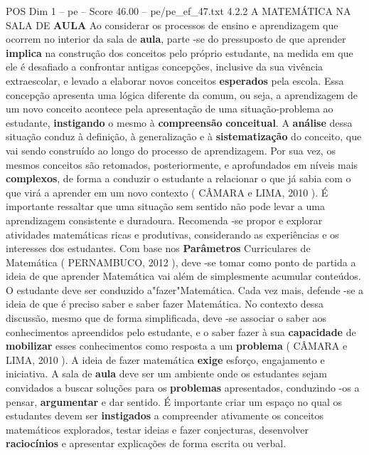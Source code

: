 \begin{textsample}{POS Dim 1 – pe – Score 46.00 – pe/pe\_ef\_47.txt}  \label{ex:f1_pos_241}
4.2.2 A MATEMÁTICA NA SALA DE \textbf{AULA} Ao considerar os processos de ensino e aprendizagem que ocorrem no interior da sala de \textbf{aula}, parte -se do pressuposto de que aprender \textbf{implica} na construção dos conceitos pelo próprio estudante, na medida em que ele é desafiado a confrontar antigas concepções, inclusive da sua vivência extraescolar, e levado a elaborar novos conceitos \textbf{esperados} pela escola.
Essa concepção apresenta uma lógica diferente da comum, ou seja, a aprendizagem de um novo conceito acontece pela apresentação de uma situação-problema ao estudante, \textbf{instigando} o mesmo à \textbf{compreensão} \textbf{conceitual}.
A \textbf{análise} dessa situação conduz à definição, à generalização e à \textbf{sistematização} do conceito, que vai sendo construído ao longo do processo de aprendizagem.
Por sua vez, os mesmos conceitos são retomados, posteriormente, e aprofundados em níveis mais \textbf{complexos}, de forma a conduzir o estudante a relacionar o que já sabia com o que virá a aprender em um novo contexto ( CÂMARA e LIMA, 2010 ).
É importante ressaltar que uma situação sem sentido não pode levar a uma aprendizagem consistente e duradoura.
Recomenda -se propor e explorar atividades matemáticas ricas e produtivas, considerando as experiências e os interesses dos estudantes.
Com base nos \textbf{Parâmetros} Curriculares de Matemática ( PERNAMBUCO, 2012 ), deve -se tomar como ponto de partida a ideia de que aprender Matemática vai além de simplesmente acumular conteúdos.
O estudante deve ser conduzido a"fazer"Matemática.
Cada vez mais, defende -se a ideia de que é preciso saber e saber fazer Matemática.
No contexto dessa discussão, mesmo que de forma simplificada, deve -se associar o saber aos conhecimentos apreendidos pelo estudante, e o saber fazer à sua \textbf{capacidade} de \textbf{mobilizar} esses conhecimentos como resposta a um \textbf{problema} ( CÂMARA e LIMA, 2010 ).
A ideia de fazer matemática \textbf{exige} esforço, engajamento e iniciativa.
A sala de \textbf{aula} deve ser um ambiente onde os estudantes sejam convidados a buscar soluções para os \textbf{problemas} apresentados, conduzindo -os a pensar, \textbf{argumentar} e dar sentido.
É importante criar um espaço no qual os estudantes devem ser \textbf{instigados} a compreender ativamente os conceitos matemáticos explorados, testar ideias e fazer conjecturas, desenvolver \textbf{raciocínios} e apresentar explicações de forma escrita ou verbal.

\end{textsample}
